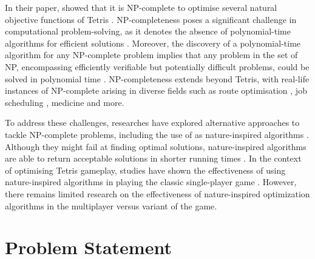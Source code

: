 \documentclass[a4paper, 12pt]{extreport}
\begin{document}
	 		In their paper, \citeauthor{tetris-is-hard-even-to-approx} showed that it is NP-complete to optimise several natural objective functions of Tetris \cite{tetris-is-hard-even-to-approx}. NP-completeness poses a significant challenge in computational problem-solving, as it denotes the absence of polynomial-time algorithms for efficient solutions \cite{npcomplete}. Moreover, the discovery of a polynomial-time algorithm for any NP-complete problem implies that any problem in the set of NP, encompassing efficiently verifiable but potentially difficult problems, could be solved in polynomial time \cite{npcomplete}. NP-completeness extends beyond Tetris, with real-life instances of NP-complete arising in diverse fields such as route optimisation \cite{route-optimisation-np-complete}, job scheduling \cite{job-scheduling-np-complete}, medicine \cite{medical-diagnosis-np-complete} and more.
	 		
	 		To address these challenges, researches have explored alternative approaches to tackle NP-complete problems, including the use of as nature-inspired algorithms \cite{job-shop-ga}. Although they might fail at finding optimal solutions, nature-inspired algorithms are able to return acceptable solutions in shorter running times \cite{review-nia-wael}. In the context of optimising Tetris gameplay, studies have shown the effectiveness of using nature-inspired algorithms in playing the classic single-player game \cite{tetris-ga-lewis} \cite{swarm-tetris}. However, there remains limited research on the effectiveness of nature-inspired optimization algorithms in the multiplayer versus variant of the game.
			
		\section{Problem Statement}
			
			
			
\end{document}
